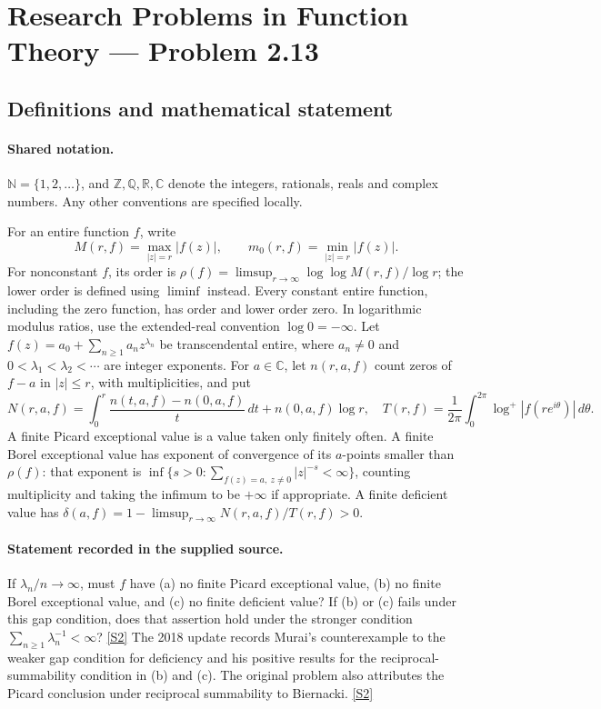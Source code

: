 \documentclass[11pt]{article}
\newcommand{\sref}[2]{\hyperlink{source:#1:#2}{[S#2]}}
\begin{document}
\section{Research Problems in Function Theory — Problem 2.13}\label{statement}

\subsection{Definitions and mathematical statement}

\paragraph{Shared notation.}$\mathbb N=\{1,2,\ldots\}$, and $\mathbb Z,\mathbb Q,\mathbb R,\mathbb C$ denote the integers, rationals, reals and complex numbers. Any other conventions are specified locally.


For an entire function $f$, write
\[
 M(r,f)=\max_{|z|=r}|f(z)|,\qquad m_0(r,f)=\min_{|z|=r}|f(z)|.
\]
For nonconstant $f$, its order is $\rho(f)=\limsup_{r\to\infty}\log\log M(r,f)/\log r$;
the lower order is defined using $\liminf$ instead. Every constant entire function, including the zero function, has order and lower order zero. In logarithmic modulus ratios, use the extended-real convention $\log0=-\infty$.
Let $f(z)=a_0+\sum_{n\ge1}a_nz^{\lambda_n}$ be transcendental entire,
where $a_n\ne0$ and $0<\lambda_1<\lambda_2<\cdots$ are integer exponents.
For $a\in\mathbb C$, let $n(r,a,f)$ count zeros of $f-a$ in $|z|\le r$, with multiplicities, and put
\[
 N(r,a,f)=\int_0^r\frac{n(t,a,f)-n(0,a,f)}{t}\,dt+n(0,a,f)\log r,
 \quad T(r,f)=\frac1{2\pi}\int_0^{2\pi}\log^+|f(re^{i\theta})|\,d\theta.
\]
A finite Picard exceptional value is a value taken only finitely often. A finite Borel exceptional value
has exponent of convergence of its $a$-points smaller than $\rho(f)$: that exponent is
$\inf\{s>0:\sum_{f(z)=a,\ z\ne0}|z|^{-s}<\infty\}$, counting multiplicity and taking the infimum to be $+\infty$ if appropriate.
A finite deficient value has $\delta(a,f)=1-\limsup_{r\to\infty}N(r,a,f)/T(r,f)>0$.

\paragraph{Statement recorded in the supplied source.}
If $\lambda_n/n\to\infty$, must $f$ have (a) no finite Picard exceptional value,
(b) no finite Borel exceptional value, and (c) no finite deficient value?
If (b) or (c) fails under this gap condition, does that assertion hold under the stronger condition
$\sum_{n\ge1}\lambda_n^{-1}<\infty$? \sref{statement}{2}
The 2018 update records Murai's counterexample to the weaker gap condition for deficiency and his positive results for the reciprocal-summability condition in (b) and (c). The original problem also attributes the Picard conclusion under reciprocal summability to Biernacki. \sref{statement}{2}
\end{document}
